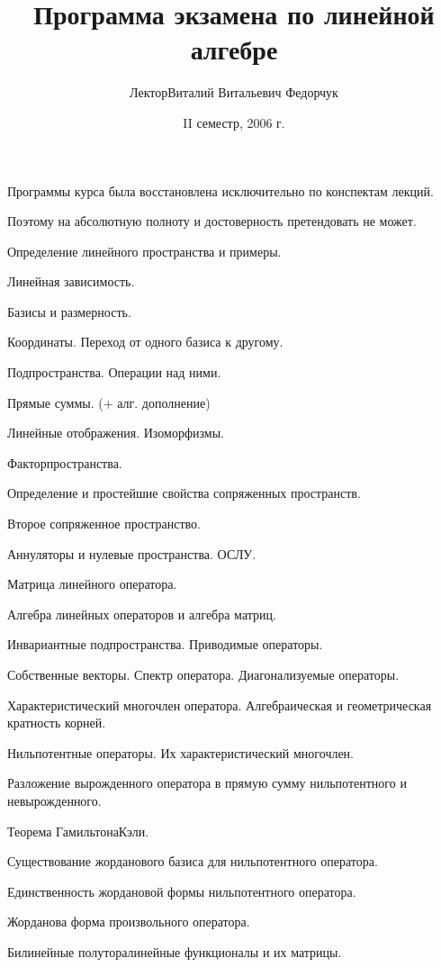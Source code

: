 \documentclass[a4paper]{article}
\title{Программа экзамена по линейной алгебре}
\author{Лектор\т Виталий Витальевич Федорчук}
\date{II семестр, 2006 г.}
\begin{document}
\maketitle

\centerline{\scriptsize Программы курса была восстановлена исключительно по конспектам лекций.}
\centerline{\scriptsize Поэтому на абсолютную полноту и достоверность претендовать не может.}

\begin{nums}{-1}
\item Определение линейного пространства и примеры.
\item Линейная зависимость.
\item Базисы и размерность.
\item Координаты. Переход от одного базиса к другому.
\item Подпространства. Операции над ними.
\item Прямые суммы. (+ алг. дополнение)
\item Линейные отображения. Изоморфизмы.
\item Факторпространства.
\item Определение и простейшие свойства сопряженных пространств.
\item Второе сопряженное пространство.
\item Аннуляторы и нулевые пространства. ОСЛУ.
\item Матрица линейного оператора.
\item Алгебра линейных операторов и алгебра матриц.
\item Инвариантные подпространства. Приводимые операторы.
\item Собственные векторы. Спектр оператора. Диагонализуемые операторы.
\item Характеристический многочлен оператора. Алгебраическая и геометрическая кратность корней.
\item Нильпотентные операторы. Их характеристический многочлен.
\item Разложение вырожденного оператора в прямую сумму нильпотентного и невырожденного.
\item Теорема Гамильтона\ч Кэли.
\item Существование жорданового базиса для нильпотентного оператора.
\item Единственность жордановой формы нильпотентного оператора.
\item Жорданова форма произвольного оператора.
\item Билинейные  полуторалинейные функционалы и их матрицы.

\end{nums}
\end{document}
